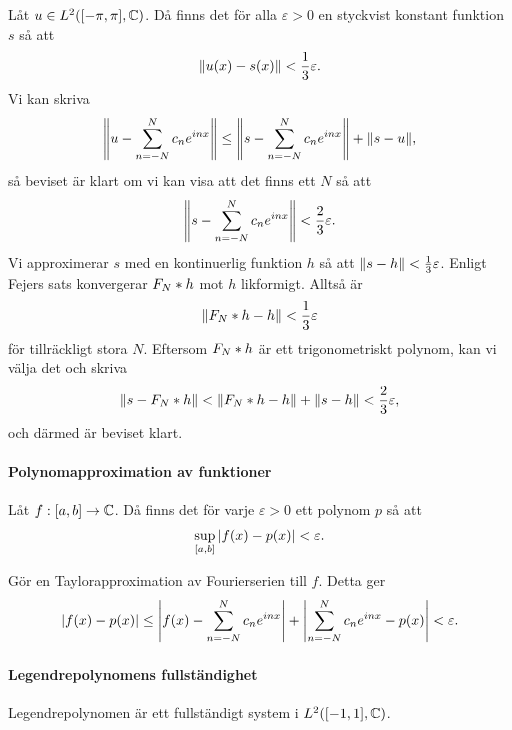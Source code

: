 \proof
Låt $u\in L^{2}([-\pi, \pi], \mathbb{C})$. Då finns det för alla $\varepsilon > 0$ en styckvist konstant funktion $s$ så att
\begin{align*}
	\norm{u(x) - s(x)} < \frac{1}{3}\varepsilon.
\end{align*}
Vi kan skriva
\begin{align*}
	\norm{u - \sum\limits_{n = -N}^{N}c_{n}e^{inx}}\leq \norm{s - \sum\limits_{n = -N}^{N}c_{n}e^{inx}} + \norm{s - u},
\end{align*}
så beviset är klart om vi kan visa att det finns ett $N$ så att
\begin{align*}
	\norm{s - \sum\limits_{n = -N}^{N}c_{n}e^{inx}} < \frac{2}{3}\varepsilon.
\end{align*}
Vi approximerar $s$ med en kontinuerlig funktion $h$ så att $\norm{s - h} < \frac{1}{3}\varepsilon$. Enligt Fejers sats konvergerar $F_{N} * h$ mot $h$ likformigt. Alltså är
\begin{align*}
	\norm{F_{N} * h - h} < \frac{1}{3}\varepsilon
\end{align*}
för tillräckligt stora $N$. Eftersom $F_{N} * h$ är ett trigonometriskt polynom, kan vi välja det och skriva
\begin{align*}
	\norm{s - F_{N} * h} < \norm{F_{N} * h - h} + \norm{s - h} < \frac{2}{3}\varepsilon,
\end{align*}
och därmed är beviset klart.

\paragraph{Polynomapproximation av funktioner}
Låt $f: [a,b]\to\mathbb{C}$. Då finns det för varje $\varepsilon > 0$ ett polynom $p$ så att
\begin{align*}
	\sup\limits_{[a, b]}\abs{f(x) - p(x)} < \varepsilon.
\end{align*}

\proof
Gör en Taylorapproximation av Fourierserien till $f$. Detta ger
\begin{align*}
	\abs{f(x) - p(x)} \leq \abs{f(x) - \sum\limits_{n = -N}^{N}c_{n}e^{inx}} + \abs{\sum\limits_{n = -N}^{N}c_{n}e^{inx} - p(x)} < \varepsilon. 
\end{align*}

\paragraph{Legendrepolynomens fullständighet}
Legendrepolynomen är ett fullständigt system i $L^{2}([-1, 1], \mathbb{C})$.

